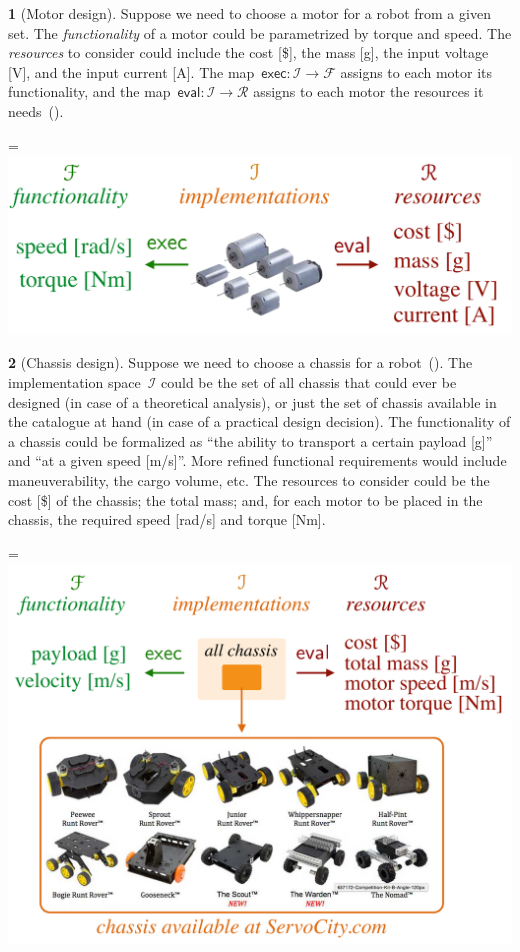 \documentclass[twocolumn,english]{IEEEtran}
\theoremstyle{definition}
\theoremstyle{plain}
\theoremstyle{definition}
\newtheorem{example}{\protect\examplename}
\theoremstyle{remark}
\theoremstyle{definition}
\theoremstyle{plain}
\theoremstyle{plain}
\newcommand{\aword}[1]{\mathsf{#1}}
\newcommand{\vmath}[1]{\aword{#1}}
\newcommand{\funsp}{\mathscr{F}}
\newcommand{\impsp}{\mathscr{I}}
\newcommand{\exc}{\vmath{exec}}
\newcommand{\eval}{\vmath{eval}}
\newcommand{\ressp}{\mathscr{R}}
\newcommand{\colR}{\color[rgb]{0.555789,0.000000,0.000000}}
\newcommand{\colF}{\color[rgb]{0.094869,0.500000,0.000000}}
\newcommand{\R}[1]{{\colR #1}}
\newcommand{\F}[1]{{\colF #1}}
\newcommand*{\vcenteredhbox}[1]{\begingroup
\setbox0=\hbox{#1}\parbox{\wd0}{\box0}\endgroup}
\newcommand{\captionsideleft}[2]{
    \medskip
    \begin{minipage}{1.8cm}{
        \hfill
        \protect\captionof{figure}{#1}}\end{minipage}
    \begin{minipage}{6.6cm}
    
    \vcenteredhbox{{#2}}
    \hfill
    \end{minipage}
    \medskip
}
\providecommand{\examplename}{Example}
\begin{document}
\begin{example}[Motor design]
\label{exa:motor}Suppose we need to choose a motor for a robot from
a given set. The \emph{functionality} of a motor could be parametrized
by \F{torque} and \F{speed}. The \emph{resources} to consider
could include the \R{cost {[}\${]}}, the \R{mass {[}g{]}}, the
input \R{voltage {[}V{]}}, and the input \R{current {[}A{]}}.
The map~$\exc:\impsp\rightarrow\funsp$ assigns to each motor its
functionality, and the map~$\eval:\impsp\rightarrow\ressp$ assigns
to each motor the resources it needs~().
\end{example}
\captionsideleft{\label{fig:motor_evalexec}}{\includegraphics[scale=0.33]{gmcdp_motor_evalexec}}
\begin{example}[Chassis design]
\label{exa:chassis}Suppose we need to choose a chassis for a robot~().
The implementation space~$\impsp$ could be the set of all chassis
that could ever be designed (in case of a theoretical analysis), or
just the set of chassis available in the catalogue at hand (in case
of a practical design decision). The functionality of a chassis could
be formalized as ``the ability to transport a certain \F{payload
{[}g{]}}'' and ``at a given \F{speed {[}m/s{]}}''. More refined
functional requirements would include maneuverability, the cargo volume,
etc. The resources to consider could be the \R{cost {[}\${]}} of
the chassis; the total mass; and, for each motor to be placed in the
chassis, the required \R{speed {[}rad/s{]}} and \R{torque {[}Nm{]}}.
\end{example}
\captionsideleft{\label{fig:gmcdp_chassis_eval}}{\includegraphics[scale=0.33]{gmcdp_chassis_eval}}
\end{document}
